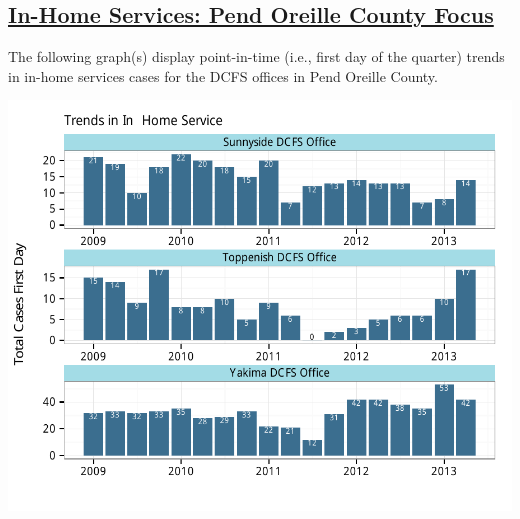 \documentclass{article}\usepackage[]{graphicx}\usepackage[]{color}
\makeatletter
\def\maxwidth{ %
  \ifdim\Gin@nat@width>\linewidth
    \linewidth
  \else
    \Gin@nat@width
  \fi
}
\newenvironment{knitrout}{}{} %
\makeatother
\begin{document}
\begin{minipage}{\textwidth}
\subsection{\href{http://www.partnersforourchildren.org/child-well-being/visualizations/home-services/trends}
    {In-Home Services: Pend Oreille County Focus}
}
The following graph(s) display point-in-time (i.e., first day of the quarter) trends in in-home services cases for the DCFS offices in Pend Oreille County. 
\nopagebreak[3]
\begin{knitrout}
\color{fgcolor}

{\centering \includegraphics[width=\maxwidth]{figure/ihs_focus} 

}



\end{knitrout}

\end{minipage}

\newpage
\end{document}
